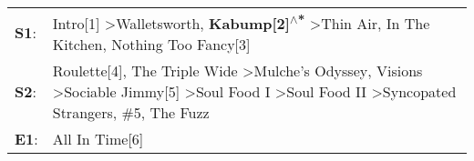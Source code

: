 \begin{supertabular}{p{0.03\textwidth}p{0.92\textwidth}}
 \textbf{S1}:  &                                                                                                                                                                                         Intro[1]\textsuperscript{} \textgreater \enspace Walletsworth\textsuperscript{}, \enspace \textbf{Kabump[2]\textsuperscript{$\wedge$*}} \textgreater \enspace Thin Air\textsuperscript{}, \enspace In The Kitchen\textsuperscript{}, \enspace Nothing Too Fancy[3]\textsuperscript{}  \enspace  \\
 \textbf{S2}:  &  Roulette[4]\textsuperscript{}, \enspace The Triple Wide\textsuperscript{} \textgreater \enspace Mulche's Odyssey\textsuperscript{}, \enspace Visions\textsuperscript{} \textgreater \enspace Sociable Jimmy[5]\textsuperscript{} \textgreater \enspace Soul Food I\textsuperscript{} \textgreater \enspace Soul Food II\textsuperscript{} \textgreater \enspace Syncopated Strangers\textsuperscript{}, \enspace \#5\textsuperscript{}, \enspace The Fuzz\textsuperscript{}  \enspace  \\
 \textbf{E1}:  &                                                                                                                                                                                                                                                                                                                                                                                                                                             All In Time[6]\textsuperscript{}  \enspace  \\
\end{supertabular}
